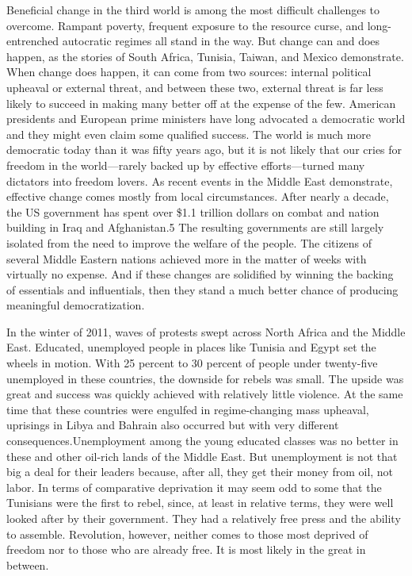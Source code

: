 \documentclass[10pt]{article}
\begin{document}
{\large Beneficial change in the third world is among the most difficult
challenges to overcome. Rampant poverty, frequent exposure to the resource curse,
and long-entrenched autocratic regimes all stand in the way. But change can and
does happen, as the stories of South Africa, Tunisia, Taiwan, and Mexico
demonstrate. When change does happen, it can come from two sources: internal
political upheaval or external threat, and between these two, external threat is
far less likely to succeed in making many better off at the expense of the few.
American presidents and European prime ministers have long advocated a democratic
world and they might even claim some qualified success. The world is much more
democratic today than it was fifty years ago, but it is not likely that our cries
for freedom in the world---rarely backed up by effective efforts---turned many
dictators into freedom lovers. As recent events in the Middle East demonstrate,
effective change comes mostly from local circumstances. After nearly a decade,
the US government has spent over \$1.1 trillion dollars on combat and nation
building in Iraq and Afghanistan.5 The resulting governments are still largely
isolated from the need to improve the welfare of the people. The citizens of
several Middle Eastern nations achieved more in the matter of weeks with
virtually no expense. And if these changes are solidified by winning the backing
of essentials and influentials, then they stand a much better chance of producing
meaningful democratization.}

{\large In the winter of 2011, waves of protests swept across North Africa and
the Middle East. Educated, unemployed people in places like Tunisia and Egypt set
the wheels in motion. With 25 percent to 30 percent of people under twenty-five
unemployed in these countries, the downside for rebels was small. The upside was
great and success was quickly achieved with relatively little violence. At the
same time that these countries were engulfed in regime-changing mass upheaval,
uprisings in Libya and Bahrain also occurred but with very different
consequences.Unemployment among the young educated classes was no better in these
and other oil-rich lands of the Middle East. But unemployment is not that big a
deal for their leaders because, after all, they get their money from oil, not
labor. In terms of comparative deprivation it may seem odd to some that the
Tunisians were the first to rebel, since, at least in relative terms, they were
well looked after by their government. They had a relatively free press and the
ability to assemble. Revolution, however, neither comes to those most deprived of
freedom nor to those who are already free. It is most likely in the great in
between.}
\end{document}
